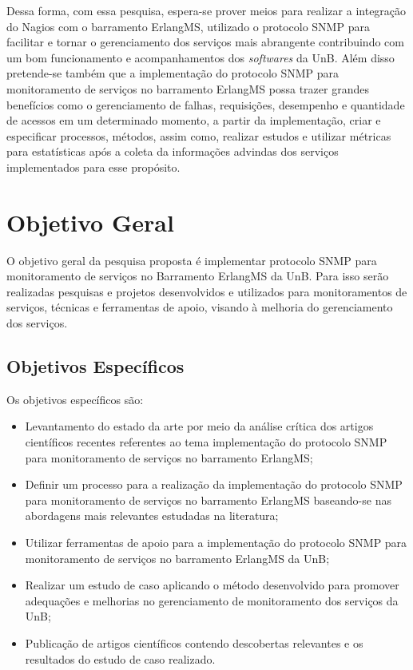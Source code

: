 \documentclass[qualidr]{eesc}
\begin{document}
Dessa forma, com essa pesquisa, espera-se prover meios para realizar a integração do Nagios com o barramento ErlangMS, utilizado o protocolo SNMP para facilitar e tornar o gerenciamento dos serviços mais abrangente contribuindo com um bom funcionamento e acompanhamentos dos \textit{softwares} da UnB. Além disso pretende-se também que a implementação do protocolo SNMP para monitoramento de serviços no barramento ErlangMS possa trazer grandes benefícios como o gerenciamento de falhas, requisições, desempenho e quantidade de acessos em um determinado momento, a partir da implementação, criar e especificar processos, métodos, assim como, realizar estudos e utilizar métricas para estatísticas após a coleta da informações advindas dos serviços implementados para esse propósito. 


\section{Objetivo Geral}

O objetivo geral da pesquisa proposta é implementar protocolo SNMP para monitoramento de serviços no Barramento ErlangMS da UnB. Para isso serão realizadas  pesquisas e projetos desenvolvidos e utilizados para monitoramentos de serviços, técnicas e ferramentas de apoio, visando à melhoria do gerenciamento dos serviços.

\subsection{Objetivos Específicos}

Os objetivos específicos são:

\begin{itemize}
	 
\item Levantamento do estado da arte por meio da análise crítica dos artigos científicos recentes referentes ao tema implementação do protocolo SNMP para monitoramento de serviços no barramento ErlangMS;

\item Definir um processo para a realização da implementação do protocolo SNMP para monitoramento de serviços no barramento ErlangMS baseando-se nas  abordagens mais relevantes estudadas na literatura;

\item Utilizar ferramentas de apoio para a implementação do protocolo SNMP para monitoramento de serviços no barramento ErlangMS da UnB;

\item Realizar um estudo de caso aplicando o método desenvolvido  para promover adequações e melhorias no gerenciamento de monitoramento dos serviços da UnB; 

\item Publicação de artigos científicos contendo descobertas relevantes e os resultados do estudo de caso realizado. 

\end{itemize}
\end{document}
